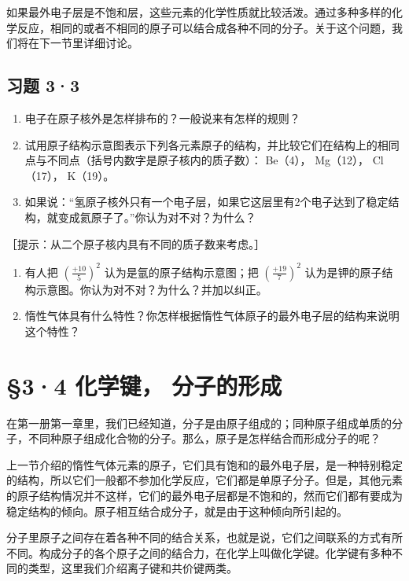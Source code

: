 如果最外电子层是不饱和层，这些元素的化学性质就比较活泼。通过多种多样的化学反应，相同的或者不相同的原子可以结合成各种不同的分子。关于这个问题，我们将在下一节里详细讨论。

\subsection{习题 3·3}

\begin{enumerate}
\item
  电子在原子核外是怎样排布的？一般说来有怎样的规则？
\item
  试用原子结构示意图表示下列各元素原子的结构，并比较它们在结构上的相同点与不同点（括号内数字是原子核内的质子数）：
  Be（4）， Mg（12）， Cl（17）， K（19）。
\item
  如果说：``氢原子核外只有一个电子层，如果它这层里有2个电子达到了稳定结构，就变成氦原子了。''你认为对不对？为什么？
\end{enumerate}

［提示：从二个原子核内具有不同的质子数来考虑。］

\begin{enumerate}[start=4]
\item
  有人把 \(\left(\frac{+10}{5}\right)^{2}\) 认为是氩的原子结构示意图；把
  \(\left(\frac{+19}{7}\right)^{2}\)
  认为是钾的原子结构示意图。你认为对不对？为什么？并加以纠正。
\item
  惰性气体具有什么特性？你怎样根据惰性气体原子的最外电子层的结构来说明这个特性？
\end{enumerate}

\section{§3·4 化学键， 分子的形成}

在第一册第一章里，我们已经知道，分子是由原子组成的；同种原子组成单质的分子，不同种原子组成化合物的分子。那么，原子是怎样结合而形成分子的呢？

上一节介绍的惰性气体元素的原子，它们具有饱和的最外电子层，是一种特别稳定的结构，所以它们一般都不参加化学反应，它们都是单原子分子。但是，其他元素的原子结构情况并不这样，它们的最外电子层都是不饱和的，然而它们都有要成为稳定结构的倾向。原子相互结合成分子，就是由于这种倾向所引起的。

分子里原子之间存在着各种不同的结合关系，也就是说，它们之间联系的方式有所不同。构成分子的各个原子之间的结合力，在化学上叫做化学键。化学键有多种不同的类型，这里我们介绍离子键和共价键两类。

